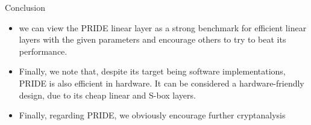 \begin{frame}{Conclusion}
\begin{block}{}
    \begin{itemize}
        \item we can view the PRIDE linear layer as a strong benchmark for efficient linear layers with the given parameters and encourage others to try to beat its performance.
    \end{itemize} 
     \end{block}
        \begin{block}{}
        \begin{itemize}
            \item  Finally, we note that, despite its target being software implementations, PRIDE is also efficient in hardware. It can be considered a hardware-friendly design, due to its cheap linear and S-box layers.
        \end{itemize}
        \end{block}
        \begin{block}{}
        \begin{itemize}
            \item   Finally, regarding PRIDE, we obviously encourage further cryptanalysis
        \end{itemize}
        \end{block}
\end{frame}